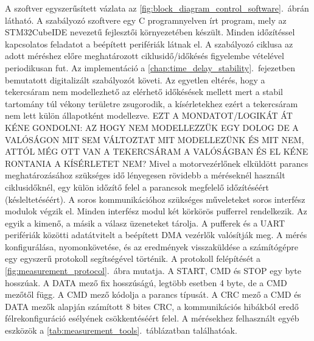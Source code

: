 A szoftver egyszerűsített vázlata az \ref{fig:block_diagram_control_software}.~ábrán látható. 
A szabályozó szoftvere egy C programnyelven írt program, mely az STM32CubeIDE nevezetű 
fejlesztői környezetében készült. 
Minden időzítéssel kapcsolatos feladatot a beépített perifériák látnak el. 
A szabályozó ciklusa az adott méréshez előre meghatározott ciklusidő/időkésés figyelembe 
vételével periodikusan fut. 
Az implementáció a \ref{chap:time_delay_stability}.~fejezetben bemutatott digitalizált szabályozót követi. 
\alert{Az egyetlen eltérés, hogy a tekercsáram nem modellezhető az elérhető időkésések mellett mert a stabil tartomány túl vékony területre zsugorodik, a kísérletekhez ezért a tekercsáram nem lett külön állapotként modellezve. 
 EZT A MONDATOT/LOGIKÁT ÁT KÉNE GONDOLNI: AZ HOGY NEM MODELLEZZÜK EGY DOLOG DE A VALÓSÁGON MIT SEM VÁLTOZTAT MIT MODELLEZÜNK ÉS MIT NEM, ATTÓL MÉG OTT VAN A TEKERCSÁRAM A VALÓSÁGBAN ÉS EL KÉNE RONTANIA A KÍSÉRLETET NEM?}
Mivel a motorvezérlőnek elküldött parancs meghatározásához szükséges idő lényegesen rövidebb a méréseknél használt ciklusidőknél, egy külön időzítő felel a parancsok megfelelő időzítéséért (késleltetéséért). 
A soros kommunikációhoz szükséges műveleteket soros interfész modulok végzik el. 
Minden interfész modul két körkörös pufferrel rendelkezik. 
Az egyik a kimenő, a másik a válasz üzeneteket tárolja. A pufferek és a UART perifériák közötti adatátvitelt a beépített DMA vezérlők valósítják meg. 
A mérés konfigurálása, nyomonkövetése, és az eredmények visszaküldése a számítógépre egy egyszerű protokoll segítségével történik. 
A protokoll felépítését a \ref{fig:measurement_protocol}.~ábra mutatja. 
A START, CMD és STOP egy byte hosszúak. A DATA mező fix hosszúságú, legtöbb esetben 4 byte, de a CMD mezőtől függ.
A CMD mező kódolja a parancs típusát. 
A CRC mező a CMD és DATA mezők alapján számított 8 bites CRC, a kommunikációs 
hibákból eredő félrekonfiguráció esélyének csökkentéséért felel. 
A mérésekhez felhasznált egyéb eszközök a \ref{tab:measurement_tools}.~táblázatban találhatóak.

